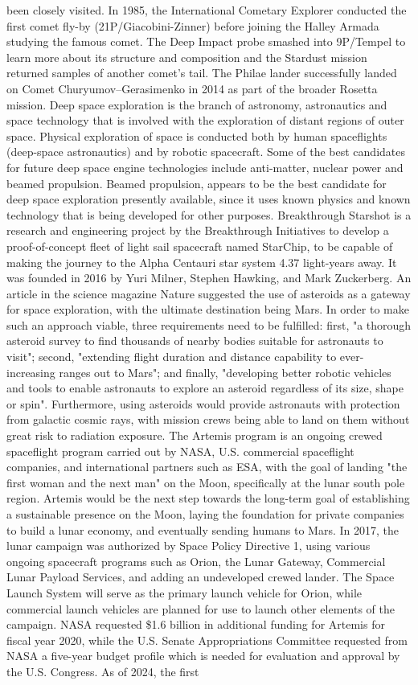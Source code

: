 \documentclass[12pt]{article}
\begin{document}
been closely visited. In 1985, the International Cometary Explorer conducted the first comet fly-by (21P/Giacobini-Zinner) before joining the Halley Armada studying the famous comet. The Deep Impact probe smashed into 9P/Tempel to learn more about its structure and composition and the Stardust mission returned samples of another comet's tail. The Philae lander successfully landed on Comet Churyumov–Gerasimenko in 2014 as part of the broader Rosetta mission. Deep space exploration is the branch of astronomy, astronautics and space technology that is involved with the exploration of distant regions of outer space. Physical exploration of space is conducted both by human spaceflights (deep-space astronautics) and by robotic spacecraft. Some of the best candidates for future deep space engine technologies include anti-matter, nuclear power and beamed propulsion. Beamed propulsion, appears to be the best candidate for deep space exploration presently available, since it uses known physics and known technology that is being developed for other purposes. Breakthrough Starshot is a research and engineering project by the Breakthrough Initiatives to develop a proof-of-concept fleet of light sail spacecraft named StarChip, to be capable of making the journey to the Alpha Centauri star system 4.37 light-years away. It was founded in 2016 by Yuri Milner, Stephen Hawking, and Mark Zuckerberg. An article in the science magazine Nature suggested the use of asteroids as a gateway for space exploration, with the ultimate destination being Mars. In order to make such an approach viable, three requirements need to be fulfilled: first, "a thorough asteroid survey to find thousands of nearby bodies suitable for astronauts to visit"; second, "extending flight duration and distance capability to ever-increasing ranges out to Mars"; and finally, "developing better robotic vehicles and tools to enable astronauts to explore an asteroid regardless of its size, shape or spin". Furthermore, using asteroids would provide astronauts with protection from galactic cosmic rays, with mission crews being able to land on them without great risk to radiation exposure. The Artemis program is an ongoing crewed spaceflight program carried out by NASA, U.S. commercial spaceflight companies, and international partners such as ESA, with the goal of landing "the first woman and the next man" on the Moon, specifically at the lunar south pole region. Artemis would be the next step towards the long-term goal of establishing a sustainable presence on the Moon, laying the foundation for private companies to build a lunar economy, and eventually sending humans to Mars. In 2017, the lunar campaign was authorized by Space Policy Directive 1, using various ongoing spacecraft programs such as Orion, the Lunar Gateway, Commercial Lunar Payload Services, and adding an undeveloped crewed lander. The Space Launch System will serve as the primary launch vehicle for Orion, while commercial launch vehicles are planned for use to launch other elements of the campaign. NASA requested \$1.6 billion in additional funding for Artemis for fiscal year 2020, while the U.S. Senate Appropriations Committee requested from NASA a five-year budget profile which is needed for evaluation and approval by the U.S. Congress. As of 2024, the first 
\end{document}
